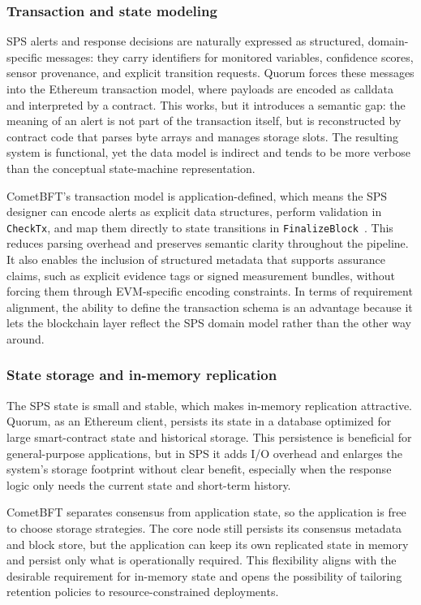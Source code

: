 \subsubsection{Transaction and state modeling}
SPS alerts and response decisions are naturally expressed as structured, domain-specific messages: they carry identifiers for monitored variables, confidence scores, sensor provenance, and explicit transition requests. Quorum forces these messages into the Ethereum transaction model, where payloads are encoded as calldata and interpreted by a contract. This works, but it introduces a semantic gap: the meaning of an alert is not part of the transaction itself, but is reconstructed by contract code that parses byte arrays and manages storage slots. The resulting system is functional, yet the data model is indirect and tends to be more verbose than the conceptual state-machine representation.

CometBFT's transaction model is application-defined, which means the SPS designer can encode alerts as explicit data structures, perform validation in \texttt{CheckTx}, and map them directly to state transitions in \texttt{FinalizeBlock}~\cite{abciOverview}. This reduces parsing overhead and preserves semantic clarity throughout the pipeline. It also enables the inclusion of structured metadata that supports assurance claims, such as explicit evidence tags or signed measurement bundles, without forcing them through EVM-specific encoding constraints. In terms of requirement alignment, the ability to define the transaction schema is an advantage because it lets the blockchain layer reflect the SPS domain model rather than the other way around.

\subsubsection{State storage and in-memory replication}
The SPS state is small and stable, which makes in-memory replication attractive. Quorum, as an Ethereum client, persists its state in a database optimized for large smart-contract state and historical storage. This persistence is beneficial for general-purpose applications, but in SPS it adds I/O overhead and enlarges the system's storage footprint without clear benefit, especially when the response logic only needs the current state and short-term history.

CometBFT separates consensus from application state, so the application is free to choose storage strategies. The core node still persists its consensus metadata and block store, but the application can keep its own replicated state in memory and persist only what is operationally required. This flexibility aligns with the desirable requirement for in-memory state and opens the possibility of tailoring retention policies to resource-constrained deployments.


